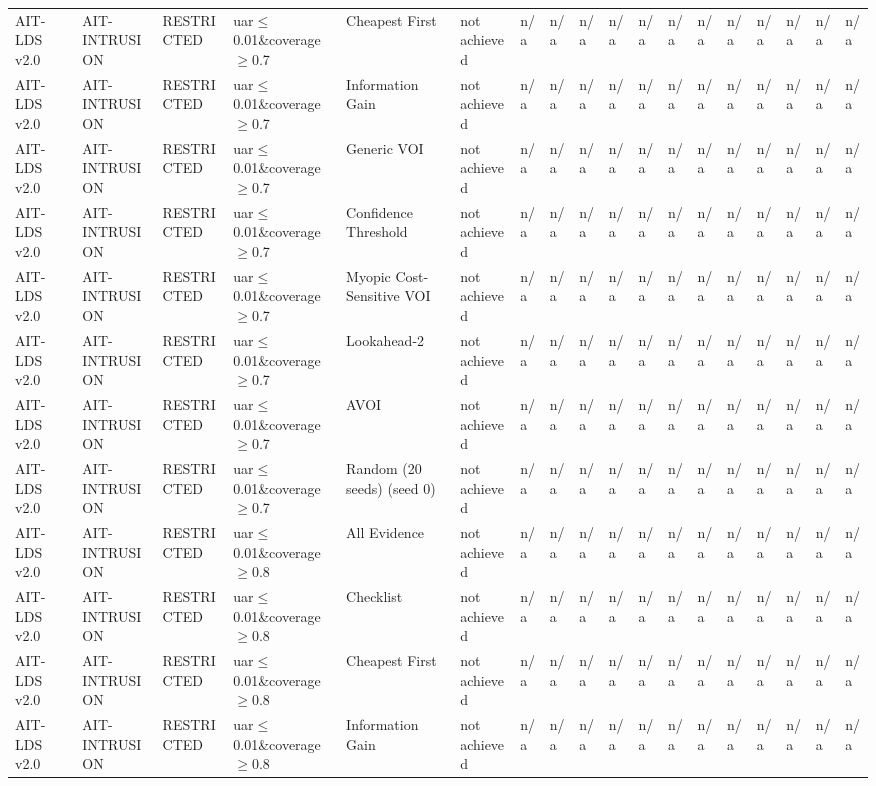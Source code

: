 \begin{table}[!ht]
{\begin{tabular}{llllllllllllllllll}
AIT-LDS v2.0 & AIT-INTRUSION & RESTRICTED & uar$\le$0.01\&coverage$\ge$0.7 & Cheapest First & not achieved & n/a & n/a & n/a & n/a & n/a & n/a & n/a & n/a & n/a & n/a & n/a & n/a \\
AIT-LDS v2.0 & AIT-INTRUSION & RESTRICTED & uar$\le$0.01\&coverage$\ge$0.7 & Information Gain & not achieved & n/a & n/a & n/a & n/a & n/a & n/a & n/a & n/a & n/a & n/a & n/a & n/a \\
AIT-LDS v2.0 & AIT-INTRUSION & RESTRICTED & uar$\le$0.01\&coverage$\ge$0.7 & Generic VOI & not achieved & n/a & n/a & n/a & n/a & n/a & n/a & n/a & n/a & n/a & n/a & n/a & n/a \\
AIT-LDS v2.0 & AIT-INTRUSION & RESTRICTED & uar$\le$0.01\&coverage$\ge$0.7 & Confidence Threshold & not achieved & n/a & n/a & n/a & n/a & n/a & n/a & n/a & n/a & n/a & n/a & n/a & n/a \\
AIT-LDS v2.0 & AIT-INTRUSION & RESTRICTED & uar$\le$0.01\&coverage$\ge$0.7 & Myopic Cost-Sensitive VOI & not achieved & n/a & n/a & n/a & n/a & n/a & n/a & n/a & n/a & n/a & n/a & n/a & n/a \\
AIT-LDS v2.0 & AIT-INTRUSION & RESTRICTED & uar$\le$0.01\&coverage$\ge$0.7 & Lookahead-2 & not achieved & n/a & n/a & n/a & n/a & n/a & n/a & n/a & n/a & n/a & n/a & n/a & n/a \\
AIT-LDS v2.0 & AIT-INTRUSION & RESTRICTED & uar$\le$0.01\&coverage$\ge$0.7 & AVOI & not achieved & n/a & n/a & n/a & n/a & n/a & n/a & n/a & n/a & n/a & n/a & n/a & n/a \\
AIT-LDS v2.0 & AIT-INTRUSION & RESTRICTED & uar$\le$0.01\&coverage$\ge$0.7 & Random (20 seeds) (seed 0) & not achieved & n/a & n/a & n/a & n/a & n/a & n/a & n/a & n/a & n/a & n/a & n/a & n/a \\
AIT-LDS v2.0 & AIT-INTRUSION & RESTRICTED & uar$\le$0.01\&coverage$\ge$0.8 & All Evidence & not achieved & n/a & n/a & n/a & n/a & n/a & n/a & n/a & n/a & n/a & n/a & n/a & n/a \\
AIT-LDS v2.0 & AIT-INTRUSION & RESTRICTED & uar$\le$0.01\&coverage$\ge$0.8 & Checklist & not achieved & n/a & n/a & n/a & n/a & n/a & n/a & n/a & n/a & n/a & n/a & n/a & n/a \\
AIT-LDS v2.0 & AIT-INTRUSION & RESTRICTED & uar$\le$0.01\&coverage$\ge$0.8 & Cheapest First & not achieved & n/a & n/a & n/a & n/a & n/a & n/a & n/a & n/a & n/a & n/a & n/a & n/a \\
AIT-LDS v2.0 & AIT-INTRUSION & RESTRICTED & uar$\le$0.01\&coverage$\ge$0.8 & Information Gain & not achieved & n/a & n/a & n/a & n/a & n/a & n/a & n/a & n/a & n/a & n/a & n/a & n/a \\

\end{tabular}}
\end{table}
